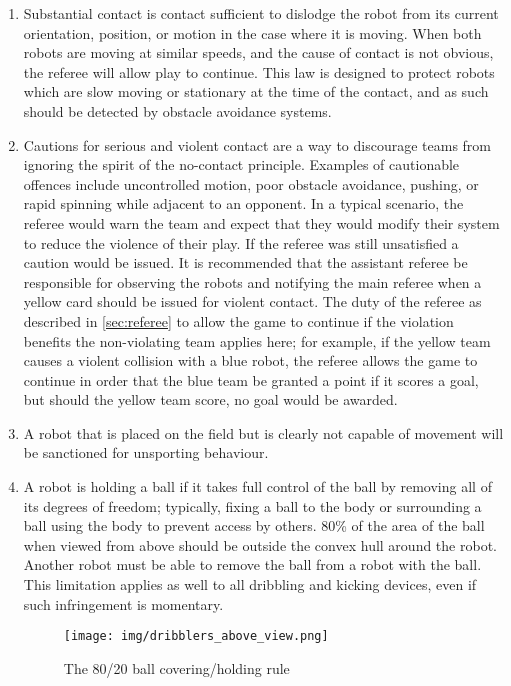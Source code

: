\begin{enumerate}
\item
Substantial contact is contact sufficient to dislodge the robot from its current orientation, position, or motion in the case where it is moving.
When both robots are moving at similar speeds, and the cause of contact is not obvious, the referee will allow play to continue.
This law is designed to protect robots which are slow moving or stationary at the time of the contact, and as such should be detected by obstacle avoidance systems.

\item
Cautions for serious and violent contact are a way to discourage teams from ignoring the spirit of the no-contact principle.
Examples of cautionable offences include uncontrolled motion, poor obstacle avoidance, pushing, or rapid spinning while adjacent to an opponent.
In a typical scenario, the referee would warn the team and expect that they would modify their system to reduce the violence of their play.
If the referee was still unsatisfied a caution would be issued.
It is recommended that the assistant referee be responsible for observing the robots and notifying the main referee when a yellow card should be issued for violent contact.
The duty of the referee as described in \autoref{sec:referee} to allow the game to continue if the violation benefits the non-violating team applies here; for example, if the yellow team causes a violent collision with a blue robot, the referee allows the game to continue in order that the blue team be granted a point if it scores a goal, but should the yellow team score, no goal would be awarded.

\item
A robot that is placed on the field but is clearly not capable of movement will be sanctioned for unsporting behaviour.

\item
A robot is holding a ball if it takes full control of the ball by removing all of its degrees of freedom; typically, fixing a ball to the body or surrounding a ball using the body to prevent access by others.
80\% of the area of the ball when viewed from above should be outside the convex hull around the robot.
Another robot must be able to remove the ball from a robot with the ball.
This limitation applies as well to all dribbling and kicking devices, even if such infringement is momentary.

\begin{figure}[ht] %
	\centering
	\texttt{[image: img/dribblers\_above\_view.png]}
	\caption{The 80/20 ball covering/holding rule}
	\label{fig:20-rule}
\end{figure}


\end{enumerate}
